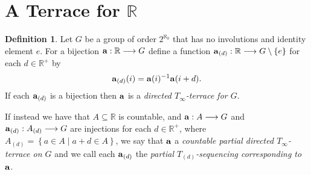 \documentclass{amsart}
\theoremstyle{definition}
\newtheorem*{definition}{Definition}
\theoremstyle{remark}
\newcommand{\R}{\mathbb{R}}
\newcommand{\st}{\; | \;}
\newcommand{\set}[2]{\left\{#1\st #2 \right\}}
\newcommand{\To}{\longrightarrow}
\renewcommand{\a}{\textup{\textbf{a}}}
\begin{document}
\section*{A Terrace for $\R$}
\begin{definition}
Let $G$ be a group of order $2^{\aleph_0}$ that has no involutions and identity element $e$. For a bijection $\a:\R \To G$ define a function $\a_{(d)}: \R \To G \setminus \{e\}$ for each $d \in \R^+$ by $$\a_{(d)}(i)=\a(i)^{-1}\a(i+d).$$ If each $\a_{(d)}$ is a bijection then $\a$ is a \emph{directed $T_\infty$-terrace for $G$}. 

If instead we have that $A \subseteq \R$ is countable, and $\a:A \To G$ and $\a_{(d)}:A_{(d)} \To G$ are injections for each $d \in \R^+$, where $A_{(d)}=\set{a \in A}{a+d \in A}$, we say that $\a$ a \emph{countable partial directed $T_\infty$-terrace on $G$} and we call each $\a_{(d)}$ the \emph{partial $T_{(d)}$-sequencing corresponding to $\a$}.
\end{definition}
\end{document}
